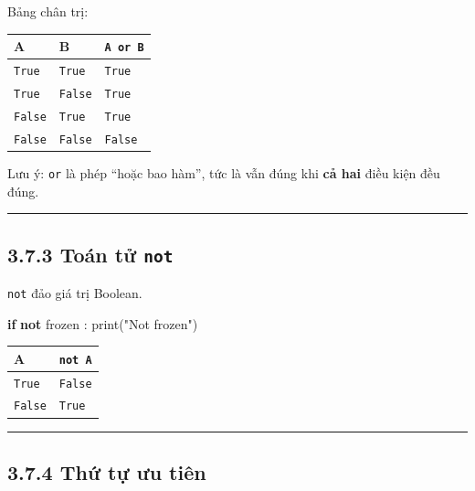 \documentclass[
  11pt,
  a4paper,
]{article}
\newenvironment{Shaded}{}{}
\newcommand{\BuiltInTok}[1]{\textcolor[rgb]{0.00,0.50,0.00}{#1}}
\newcommand{\ControlFlowTok}[1]{\textcolor[rgb]{0.00,0.44,0.13}{\textbf{#1}}}
\newcommand{\KeywordTok}[1]{\textcolor[rgb]{0.00,0.44,0.13}{\textbf{#1}}}
\newcommand{\NormalTok}[1]{#1}
\newcommand{\StringTok}[1]{\textcolor[rgb]{0.25,0.44,0.63}{#1}}
\begin{document}
Bảng chân trị:

\begin{longtable}[]{@{}lll@{}}
\toprule\noalign{}
A & B & \texttt{A\ or\ B} \\
\midrule\noalign{}
\endhead
\bottomrule\noalign{}
\endlastfoot
\texttt{True} & \texttt{True} & \texttt{True} \\
\texttt{True} & \texttt{False} & \texttt{True} \\
\texttt{False} & \texttt{True} & \texttt{True} \\
\texttt{False} & \texttt{False} & \texttt{False} \\
\end{longtable}

Lưu ý: \texttt{or} là phép ``hoặc bao hàm'', tức là vẫn đúng khi
\textbf{cả hai} điều kiện đều đúng.

\begin{center}\rule{0.5\linewidth}{0.5pt}\end{center}

\subsection{\texorpdfstring{3.7.3 Toán tử
\texttt{not}}{3.7.3 Toán tử not}}\label{touxe1n-tux1eed-not}

\texttt{not} đảo giá trị Boolean.

\begin{Shaded}
\begin{Highlighting}[]
\ControlFlowTok{if} \KeywordTok{not}\NormalTok{ frozen :}
    \BuiltInTok{print}\NormalTok{(}\StringTok{"Not frozen"}\NormalTok{)}
\end{Highlighting}
\end{Shaded}

\begin{longtable}[]{@{}ll@{}}
\toprule\noalign{}
A & \texttt{not\ A} \\
\midrule\noalign{}
\endhead
\bottomrule\noalign{}
\endlastfoot
\texttt{True} & \texttt{False} \\
\texttt{False} & \texttt{True} \\
\end{longtable}

\begin{center}\rule{0.5\linewidth}{0.5pt}\end{center}

\subsection{3.7.4 Thứ tự ưu tiên}\label{thux1ee9-tux1ef1-ux1b0u-tiuxean}
\end{document}
